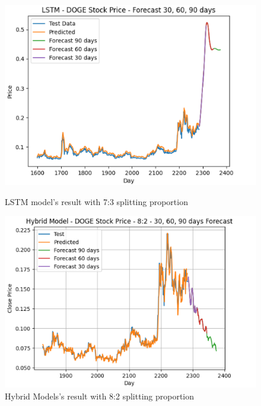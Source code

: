 \documentclass{ieeeojies}
\begin{document}
\begin{figure}[H]
    \centering
    \begin{minipage}{0.23\textwidth}
    \centering
    \includegraphics[width=1\textwidth]{bibliography/Figure/PREDICT/LSTM/LSTM-7-3-DOGE.png}
    \caption{LSTM model's result with 7:3 splitting proportion}
    \label{fig10}
    \end{minipage}
    \hfill
    \begin{minipage}{0.23\textwidth}
    \centering
    \includegraphics[width=1\textwidth]{bibliography/Figure/PREDICT/HYBRID MODELS/HB-8-2-DOGE.png}
    \caption{Hybrid Models's result with 8:2 splitting proportion}
    \label{fig11}
    \end{minipage}
\end{figure}
\end{document}
